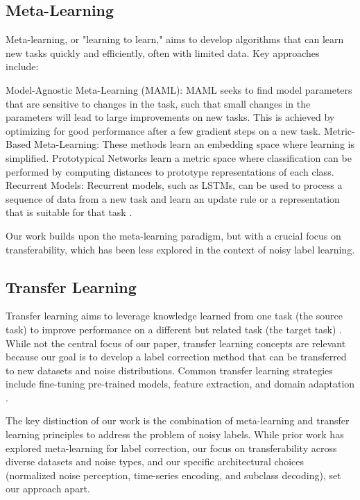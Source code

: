 \subsection{Meta-Learning}
\label{sec:related_meta}

Meta-learning, or "learning to learn," aims to develop algorithms that can learn new tasks quickly and efficiently, often with limited data. Key approaches include:

Model-Agnostic Meta-Learning (MAML): MAML \cite{finn2017model} seeks to find model parameters that are sensitive to changes in the task, such that small changes in the parameters will lead to large improvements on new tasks. This is achieved by optimizing for good performance after a few gradient steps on a new task.
Metric-Based Meta-Learning: These methods learn an embedding space where learning is simplified.  Prototypical Networks \cite{snell2017prototypical} learn a metric space where classification can be performed by computing distances to prototype representations of each class.
Recurrent Models:  Recurrent models, such as LSTMs, can be used to process a sequence of data from a new task and learn an update rule or a representation that is suitable for that task \cite{andrychowicz2016learning, munkhdalai2017meta}.

Our work builds upon the meta-learning paradigm, but with a crucial focus on transferability, which has been less explored in the context of noisy label learning.

\subsection{Transfer Learning}
\label{sec:related_transfer}

Transfer learning aims to leverage knowledge learned from one task (the source task) to improve performance on a different but related task (the target task) \cite{pan2009survey, taylor2009transfer}.  While not the central focus of our paper, transfer learning concepts are relevant because our goal is to develop a label correction method that can be transferred to new datasets and noise distributions.  Common transfer learning strategies include fine-tuning pre-trained models, feature extraction, and domain adaptation \cite{ganin2015domain}.

The key distinction of our work is the combination of meta-learning and transfer learning principles to address the problem of noisy labels.  While prior work has explored meta-learning for label correction, our focus on transferability across diverse datasets and noise types, and our specific architectural choices (normalized noise perception, time-series encoding, and subclass decoding), set our approach apart.